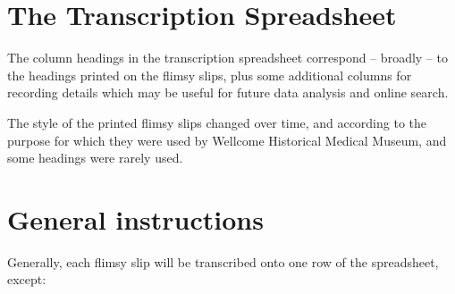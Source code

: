 \documentclass[
  openany]{book}
\begin{document}
\hypertarget{the-transcription-spreadsheet}{%
\section{The Transcription Spreadsheet}\label{the-transcription-spreadsheet}}

The column headings in the transcription spreadsheet correspond -- broadly -- to the headings printed on the flimsy slips, plus some additional columns for recording details which may be useful for future data analysis and online search.

The style of the printed flimsy slips changed over time, and according to the purpose for which they were used by Wellcome Historical Medical Museum, and some headings were rarely used.

\hypertarget{general-instructions}{%
\section{General instructions}\label{general-instructions}}

Generally, each flimsy slip will be transcribed onto one row of the spreadsheet, except:
\end{document}
